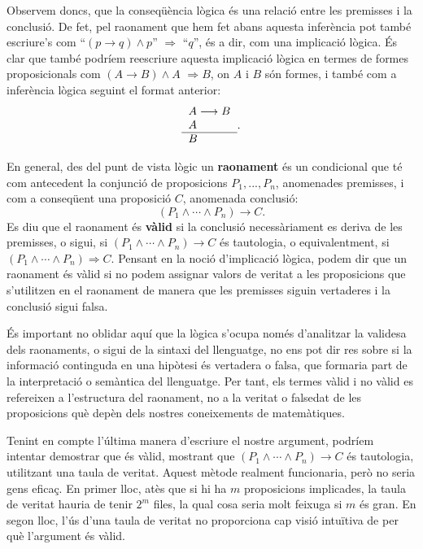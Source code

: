 \bigskip

Observem doncs, que la conseqüència lògica és una relació
entre les premisses i la conclusió. De fet, pel raonament que hem fet
abans aquesta inferència pot també escriure's com \enquote{$\left(
p\rightarrow q\right) \wedge p$} $\Longrightarrow$ \enquote{$q$}, és a dir, com
una implicació lògica. És clar que també podríem
reescriure aquesta implicació lògica en termes de formes
proposicionals com $(A\longrightarrow B)\wedge A$ $\Longrightarrow B$, on $A$
i $B$ són formes, i també com a inferència lògica seguint el
format anterior:\begin{equation*}
\begin{tabular}{l}
$A\longrightarrow B$ \\
$A$ \\ \hline
$B$\end{tabular}
\text{.}
\end{equation*}

En general, des del punt de vista lògic un \textbf{raonament} és un
condicional que té com antecedent la conjunció de proposicions $P_{1},...,P_{n}$, anomenades premisses, i com a conseqüent una proposició $C$, anomenada conclusió:\begin{equation*}
\left( P_{1}\wedge\cdots\wedge P_{n}\right) \longrightarrow C\text{.}
\end{equation*}
Es diu que el raonament és \textbf{vàlid} si la conclusió necessàriament es deriva de les premisses, o sigui, si $\left(
P_{1}\wedge\cdots\wedge P_{n}\right) \longrightarrow C$ és tautologia, o
equivalentment, si $\left( P_{1}\wedge\cdots\wedge P_{n}\right)
\Longrightarrow C$. Pensant en la noció d'implicació lògica,
podem dir que un raonament és vàlid si no podem assignar valors de
veritat a les proposicions que s'utilitzen en el raonament de manera que les
premisses siguin vertaderes i la conclusió sigui falsa.

\bigskip

És important no oblidar aquí que la lògica s'ocupa només
d'analitzar la validesa dels raonaments, o sigui de la sintaxi del
llenguatge, no ens pot dir res sobre si la informació continguda en una
hipòtesi és vertadera o falsa, que formaria part de la interpretació o semàntica del llenguatge. Per tant, els termes vàlid i no vàlid es refereixen a l'estructura del raonament, no a la veritat o
falsedat de les proposicions què depèn dels nostres coneixements de
matemàtiques.

\bigskip

Tenint en compte l'última manera d'escriure el nostre argument, podríem intentar demostrar que és vàlid, mostrant que $\left(
P_{1}\wedge\cdots\wedge P_{n}\right) \longrightarrow C$ és tautologia,
utilitzant una taula de veritat. Aquest mètode realment funcionaria, però no seria gens eficaç. En primer lloc, atès que si hi ha $m$
proposicions implicades, la taula de veritat hauria de tenir $2^{m}$ files,
la qual cosa seria molt feixuga si $m$ és gran. En segon lloc, l'ús
d'una taula de veritat no proporciona cap visió intuïtiva de per què l'argument és vàlid.

